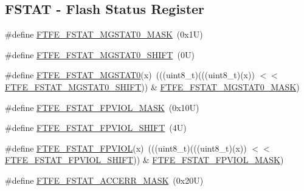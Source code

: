 \subsection*{F\+S\+T\+AT -\/ Flash Status Register}
\begin{DoxyCompactItemize}
\item 
\#define \mbox{\hyperlink{group___f_t_f_e___register___masks_ga8144f9200ceb6565f82fb1a1fa7cc81f}{F\+T\+F\+E\+\_\+\+F\+S\+T\+A\+T\+\_\+\+M\+G\+S\+T\+A\+T0\+\_\+\+M\+A\+SK}}~(0x1\+U)
\item 
\#define \mbox{\hyperlink{group___f_t_f_e___register___masks_ga0b957ce5ef0e701ed13ad42b933d07c3}{F\+T\+F\+E\+\_\+\+F\+S\+T\+A\+T\+\_\+\+M\+G\+S\+T\+A\+T0\+\_\+\+S\+H\+I\+FT}}~(0\+U)
\item 
\#define \mbox{\hyperlink{group___f_t_f_e___register___masks_ga2c3ce6efcf55c83a529941a880b83b95}{F\+T\+F\+E\+\_\+\+F\+S\+T\+A\+T\+\_\+\+M\+G\+S\+T\+A\+T0}}(x)~(((uint8\+\_\+t)(((uint8\+\_\+t)(x)) $<$$<$ \mbox{\hyperlink{group___f_t_f_e___register___masks_ga0b957ce5ef0e701ed13ad42b933d07c3}{F\+T\+F\+E\+\_\+\+F\+S\+T\+A\+T\+\_\+\+M\+G\+S\+T\+A\+T0\+\_\+\+S\+H\+I\+FT}})) \& \mbox{\hyperlink{group___f_t_f_e___register___masks_ga8144f9200ceb6565f82fb1a1fa7cc81f}{F\+T\+F\+E\+\_\+\+F\+S\+T\+A\+T\+\_\+\+M\+G\+S\+T\+A\+T0\+\_\+\+M\+A\+SK}})
\item 
\#define \mbox{\hyperlink{group___f_t_f_e___register___masks_ga5e42a62c072299c6b9e89000a88d14a6}{F\+T\+F\+E\+\_\+\+F\+S\+T\+A\+T\+\_\+\+F\+P\+V\+I\+O\+L\+\_\+\+M\+A\+SK}}~(0x10\+U)
\item 
\#define \mbox{\hyperlink{group___f_t_f_e___register___masks_gad92dedd179d9ea0737c82d0e98e5d4ff}{F\+T\+F\+E\+\_\+\+F\+S\+T\+A\+T\+\_\+\+F\+P\+V\+I\+O\+L\+\_\+\+S\+H\+I\+FT}}~(4\+U)
\item 
\#define \mbox{\hyperlink{group___f_t_f_e___register___masks_gae0c9ec869b76ac01dcbb63c1bb295764}{F\+T\+F\+E\+\_\+\+F\+S\+T\+A\+T\+\_\+\+F\+P\+V\+I\+OL}}(x)~(((uint8\+\_\+t)(((uint8\+\_\+t)(x)) $<$$<$ \mbox{\hyperlink{group___f_t_f_e___register___masks_gad92dedd179d9ea0737c82d0e98e5d4ff}{F\+T\+F\+E\+\_\+\+F\+S\+T\+A\+T\+\_\+\+F\+P\+V\+I\+O\+L\+\_\+\+S\+H\+I\+FT}})) \& \mbox{\hyperlink{group___f_t_f_e___register___masks_ga5e42a62c072299c6b9e89000a88d14a6}{F\+T\+F\+E\+\_\+\+F\+S\+T\+A\+T\+\_\+\+F\+P\+V\+I\+O\+L\+\_\+\+M\+A\+SK}})
\item 
\#define \mbox{\hyperlink{group___f_t_f_e___register___masks_gac4af2fee557a255ba6f2d9aa5d32aaaa}{F\+T\+F\+E\+\_\+\+F\+S\+T\+A\+T\+\_\+\+A\+C\+C\+E\+R\+R\+\_\+\+M\+A\+SK}}~(0x20\+U)
\item 

\end{DoxyCompactItemize}
